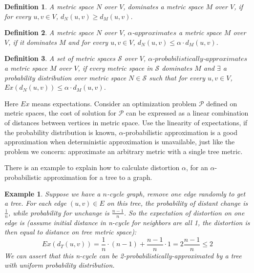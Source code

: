 \documentclass[11pt,twoside, onecolumn]{IEEEtran}
\newtheorem{Definition}{Definition}[section]
\newtheorem{Example}{Example}[section]
\begin{document}
\begin{Definition}
A metric space $N$ over $V$, \emph{dominates} a metric space $M$ over $V$, if for
every $u,v\in V$, $d_N(u,v)\geq d_M(u,v)$.
\end{Definition}
\begin{Definition}
A metric space $N$ over $V$, $\alpha$-$approximates$ a metric space $M$ over $V$, if it dominates $M$
and for every $u,v\in V$, $d_N(u,v) \leq \alpha\cdot d_M(u,v)$.
\end{Definition}
\begin{Definition}
A set of metric spaces $\mathcal{S}$ over $V$, $\alpha$-$probabilistically$-$approximates$ a metric
space $M$ over $V$, if every metric space in $\mathcal{S}$ dominates $M$ and $\exists$ a probability 
distribution over metric space $N\in \mathcal{S}$ such that for every $u,v\in V$, 
$Ex(d_N(u,v))\leq \alpha\cdot d_M(u,v)$.
\end{Definition}
Here $Ex$ means expectations. Consider an optimization problem $\mathcal{P}$ defined on metric spaces,
the cost of solution for $\mathcal{P}$ can be expressed as a linear combination of distances between
vertices in metric space.\cite{bartal98} Use the linearity of expectations, if the probability distribution is known,
$\alpha$-probabilistic approximation is a good approximation when deterministic approximation is 
unavailable, just like the problem we concern: approximate an arbitrary metric with a single tree metric.

There is an example to explain how to calculate distortion $\alpha$, for an $\alpha$-probabilistic approximation for a tree to a graph.
\begin{Example}
\label{ex:ncycle}
Suppose we have a $n$-cycle graph, remove one edge randomly to get a tree. For each edge $(u,v)\in E$ on this 
tree, the probability of distant change is $\frac{1}{n}$, while probability for unchange is $\frac{n-1}{n}$.
So the expectation of distortion on one edge is (assume initial distance in n-cycle for neighbors are all 1,
the distortion is then equal to distance on tree metric space):
$$Ex(d_T(u,v)) = \frac{1}{n}\cdot (n-1) + \frac{n-1}{n} \cdot 1 = 2\frac{n-1}{n} \leq 2$$
We can assert that this n-cycle can be \emph{2-probabilistically-approximated} by a tree with uniform probability distribution.
\end{Example}
\end{document}
